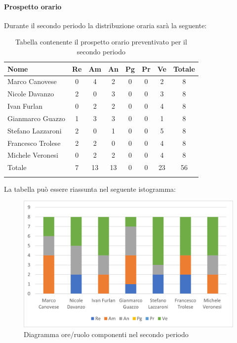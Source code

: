 	\paragraph{Prospetto orario}
			Durante il secondo periodo la distribuzione oraria sarà la seguente:
			
			\begin{longtable}{|l|c|c|c|c|c|c|c|}
				\hline
				\rowcolor{lighter-grayer}
				\textbf{Nome} & \textbf{Re} & \textbf{Am} & \textbf{An} & \textbf{Pg}  & \textbf{Pr}   & \textbf{Ve} & \textbf{Totale} \\
				\hline
				\endfirsthead
				
				\hline
				Marco Canovese & 0 & 4 & 2 & 0 & 0 & 2 & 8\\
				\hline
				\hline
				Nicole Davanzo & 2 & 0 & 3 & 0 & 0 & 3 & 8\\
				\hline
				\hline
				Ivan Furlan & 0 & 2 & 2 & 0 & 0 & 4 & 8\\
				\hline
				\hline
				Gianmarco Guazzo & 1 & 3 & 3 & 0 & 0 & 1 & 8\\
				\hline
				\hline
				Stefano Lazzaroni & 2 & 0 & 1 & 0 & 0 & 5 & 8\\
				\hline
				\hline
				Francesco Trolese & 2 & 2 & 0 & 0 & 0 & 4 & 8\\
				\hline
				\hline
				Michele Veronesi & 0 & 2 & 2 & 0 & 0 & 4 & 8\\
				\hline 
				\hline
				Totale & 7 & 13 & 13 & 0 & 0 & 23 & 56\\
				\hline
				\rowcolor{white} 
				\caption{Tabella contenente il prospetto orario preventivato per il secondo periodo}
			\end{longtable}

		
			La tabella può essere riassunta nel seguente istogramma:
		
			\begin{figure}[H]
				\centering
				\includegraphics[width=0.8\linewidth]{res/images/preventivo/dettaglio_analisi/2-1.png}
				\caption{Diagramma ore/ruolo componenti nel secondo periodo}
				\label{fig:diagramma suddivisione ruoli secondo periodo analisi}
			\end{figure}
		
